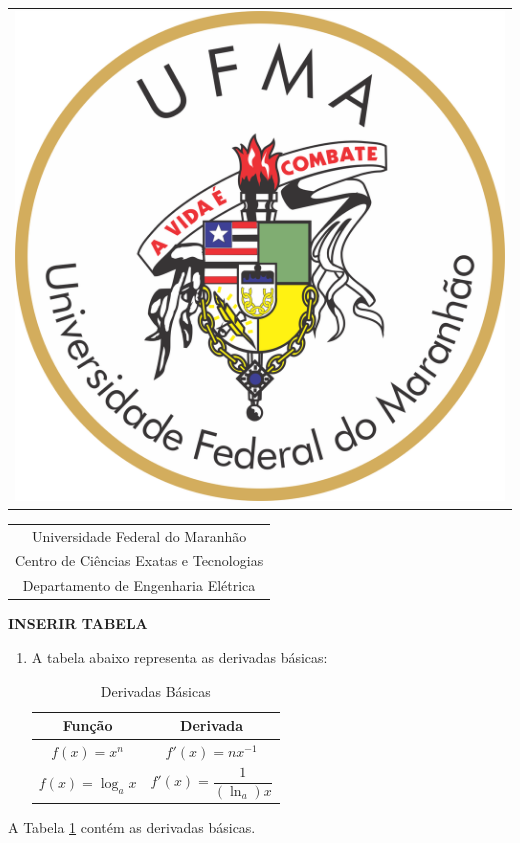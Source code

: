 \documentclass[12pt,a4paper]{article}
\begin{document}
    \begin{table}[htb]
        \centering
        \begin{tabular}{c}\includegraphics[scale=0.2]{ufma.png}\end{tabular}
        \begin{tabular}{c}
        Universidade Federal do Maranhão \\
        Centro de Ciências Exatas e Tecnologias \\
        Departamento de Engenharia Elétrica \\
        \end{tabular}
    \end{table}

    \textbf{INSERIR TABELA}
    
    \begin{enumerate}
        \item A tabela abaixo representa as derivadas básicas:
        
        \begin{table}[htb]
            \centering
            \begin{tabular}{c|c}
                Função       &  Derivada \\
                \hline
                $f(x) = x^n$ &  $f'(x)=nx^{-1}$\\
                $f(x) = \log_a x$ &  $f'(x)=\dfrac{1}{(\ln_a) x}$ 
            \end{tabular}
            \caption{Derivadas Básicas}
            \label{tab:derivadas}
        \end{table}
        
    \end{enumerate}

    A Tabela \ref{tab:derivadas} contém as derivadas básicas. 
    
    
    
\end{document}
